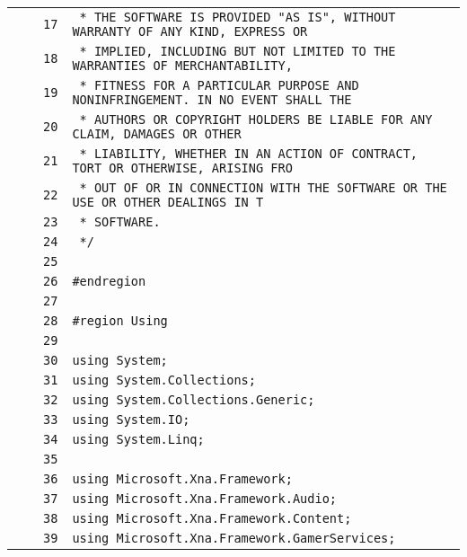 \documentclass[a4paper,10pt]{article}
\begin{document}
\begin{longtable}[l]{lrrl}
\cellcolor{gray} &  & \verb~17~ & \verb~ * THE SOFTWARE IS PROVIDED "AS IS", WITHOUT WARRANTY OF ANY KIND, EXPRESS OR~\\
\cellcolor{gray} &  & \verb~18~ & \verb~ * IMPLIED, INCLUDING BUT NOT LIMITED TO THE WARRANTIES OF MERCHANTABILITY,~\\
\cellcolor{gray} &  & \verb~19~ & \verb~ * FITNESS FOR A PARTICULAR PURPOSE AND NONINFRINGEMENT. IN NO EVENT SHALL THE~\\
\cellcolor{gray} &  & \verb~20~ & \verb~ * AUTHORS OR COPYRIGHT HOLDERS BE LIABLE FOR ANY CLAIM, DAMAGES OR OTHER~\\
\cellcolor{gray} &  & \verb~21~ & \verb~ * LIABILITY, WHETHER IN AN ACTION OF CONTRACT, TORT OR OTHERWISE, ARISING FRO~\\
\cellcolor{gray} &  & \verb~22~ & \verb~ * OUT OF OR IN CONNECTION WITH THE SOFTWARE OR THE USE OR OTHER DEALINGS IN T~\\
\cellcolor{gray} &  & \verb~23~ & \verb~ * SOFTWARE.~\\
\cellcolor{gray} &  & \verb~24~ & \verb~ */~\\
\cellcolor{gray} &  & \verb~25~ & \verb~~\\
\cellcolor{gray} &  & \verb~26~ & \verb~#endregion~\\
\cellcolor{gray} &  & \verb~27~ & \verb~~\\
\cellcolor{gray} &  & \verb~28~ & \verb~#region Using~\\
\cellcolor{gray} &  & \verb~29~ & \verb~~\\
\cellcolor{gray} &  & \verb~30~ & \verb~using System;~\\
\cellcolor{gray} &  & \verb~31~ & \verb~using System.Collections;~\\
\cellcolor{gray} &  & \verb~32~ & \verb~using System.Collections.Generic;~\\
\cellcolor{gray} &  & \verb~33~ & \verb~using System.IO;~\\
\cellcolor{gray} &  & \verb~34~ & \verb~using System.Linq;~\\
\cellcolor{gray} &  & \verb~35~ & \verb~~\\
\cellcolor{gray} &  & \verb~36~ & \verb~using Microsoft.Xna.Framework;~\\
\cellcolor{gray} &  & \verb~37~ & \verb~using Microsoft.Xna.Framework.Audio;~\\
\cellcolor{gray} &  & \verb~38~ & \verb~using Microsoft.Xna.Framework.Content;~\\
\cellcolor{gray} &  & \verb~39~ & \verb~using Microsoft.Xna.Framework.GamerServices;~\\

\end{longtable}
\end{document}
